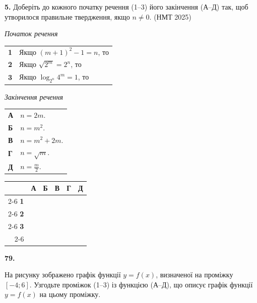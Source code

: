 \documentclass[14pt]{extarticle}
\newcommand{\answerGrid}{
    \begingroup
    \setlength{\tabcolsep}{4pt}
    \renewcommand{\arraystretch}{1.2}
    \small
    \begin{tabular}{r|c|c|c|c|c|}
         \multicolumn{1}{c}{} & \multicolumn{1}{c}{\textbf{А}} & \multicolumn{1}{c}{\textbf{Б}} & \multicolumn{1}{c}{\textbf{В}} & \multicolumn{1}{c}{\textbf{Г}} & \multicolumn{1}{c}{\textbf{Д}} \\ \cline{2-6}
         \textbf{1} & & & & & \\ \cline{2-6}
         \textbf{2} & & & & & \\ \cline{2-6}
         \textbf{3} & & & & & \\ \cline{2-6}
    \end{tabular}
    \endgroup
}
\newcommand{\nmtyear}[1]{\hfill{\small\color{yearcolor}(НМТ #1)}}
\begin{document}
\noindent\textbf{5.} Доберіть до кожного початку речення (1–3) його закінчення (А–Д) так, щоб утворилося правильне твердження, якщо $n \neq 0$. \nmtyear{2025}
\vspace{0.3cm}

\noindent
\begin{minipage}[t]{0.45\textwidth}
    \textit{Початок речення} \par \vspace{0.2cm}
    \begin{tabular}{@{}p{0.5cm} l@{}}
    \textbf{1} & Якщо $(m + 1)^2 - 1 = n$, то \\[0.4cm]
    \textbf{2} & \colorbox{yellow!30}{Якщо $\sqrt{2^m} = 2^n$, то} \\[0.4cm]
    \textbf{3} & Якщо $\log_{2^n} 4^m = 1$, то \\
    \end{tabular}
\end{minipage}%
\hfill
\begin{minipage}[t]{0.30\textwidth}
    \textit{Закінчення речення} \par \vspace{0.2cm}
    \begin{tabular}{@{}p{0.5cm} l@{}}
    \textbf{А} & $n = 2m$. \\[0.2cm]
    \textbf{Б} & $n = m^2$. \\[0.2cm]
    \textbf{В} & $n = m^2 + 2m$. \\[0.2cm]
    \textbf{Г} & $n = \sqrt{m}$. \\[0.2cm]
    \textbf{Д} & $n = \displaystyle\frac{m}{2}$. \\
    \end{tabular}
\end{minipage}%
\hfill
\begin{minipage}[t]{0.20\textwidth}
    \raggedleft
    \answerGrid
\end{minipage}
\noindent\textbf{79.} \begin{minipage}[t]{0.55\textwidth}
На рисунку зображено графік функції $y=f(x)$, визначеної на проміжку $[-4; 6]$. Узгодьте проміжок (1--3) із функцією (А--Д), що описує графік функції $y=f(x)$ на цьому проміжку.
\end{minipage}
\hfill
\end{document}
